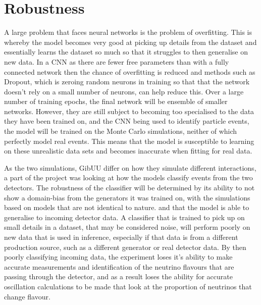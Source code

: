 \section{Robustness}

\noindent A large problem that faces neural networks is the problem of overfitting. This is whereby the model becomes very good at picking up details from the dataset and essentially learns the dataset so much so that it struggles to then generalise on new data. In a CNN as there are fewer free parameters than with a fully connected network then the chance of overfitting is reduced \cite{Brenzke} and methods such as Dropout, which is zeroing random neurons in training so that that the network doesn’t rely on a small number of neurons, can help reduce this. Over a large number of training epochs, the  final network will be ensemble of smaller networks. However, they are still subject to becoming too specialised to the data they have been trained on, and the CNN being used to identify particle events, the model will be trained on the Monte Carlo simulations, neither of which perfectly model real events. This means that the model is susceptible to learning on these unrealistic data sets and becomes inaccurate when fitting for real data. \medskip

\noindent As the two simulations, GibUU differ on how they simulate different interactions, a part of the project was looking at how the models classify events from the two detectors. The robustness of the classifier will be determined by its ability to not show a domain-bias from the generators it was trained on, with the simulations based on models that are not identical to nature.\cite{Perdue} and that the model is able to generalise to incoming detector data. A classifier that is trained to pick up on small details in a dataset, that may be considered noise, will perform poorly on new data that is used in inference, especially if that data is from a different production source, such as a different generator or real detector data. By then poorly classifying incoming data, the experiment loses it's ability to make accurate measurements and identification of the neutrino flavours that are passing through the detector, and as a result loses the ability for accurate oscillation calculations to be made that look at the proportion of neutrinos that change flavour. \medskip

